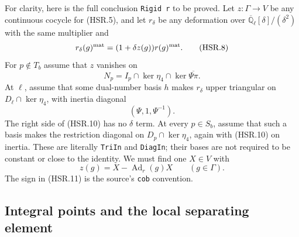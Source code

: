 For clarity, here is the full conclusion \texttt{Rigid r} to be
proved.  Let $z:\Gamma\to V$ be any continuous cocycle for (HSR.5),
and let $r_\delta$ be any deformation over
$\overline{\mathbb Q}_\ell[\delta]/(\delta^2)$ with the same
multiplier and
\[
 r_\delta(g)^{\rm mat}=(1+\delta z(g))r(g)^{\rm mat}.
 \tag{HSR.8}
\]
For $p\notin T_b$ assume that $z$ vanishes on
\[
 N_p=I_p\cap\ker\eta_4\cap\ker\overline{\Psi\pi}.
 \tag{HSR.9}
\]
At $\ell$, assume that some dual-number basis $h$ makes $r_\delta$
upper triangular on $D_\ell\cap\ker\eta_4$, with inertia diagonal
\[
                  (\Psi,1,\Psi^{-1}).
 \tag{HSR.10}
\]
The right side of (HSR.10) has no $\delta$ term.  At every
$p\in S_b$, assume that such a basis makes the restriction diagonal
on $D_p\cap\ker\eta_4$, again with (HSR.10) on inertia.  These
are literally \texttt{TriIn} and \texttt{DiagIn}; their bases are
not required to be constant or close to the identity.  We must find
one $X\in V$ with
\[
                  z(g)=X-\operatorname{Ad}_r(g)X
                  \qquad(g\in\Gamma).
 \tag{HSR.11}
\]
The sign in (HSR.11) is the source's \texttt{cob} convention.

\subsection{Integral points and the local separating element}

